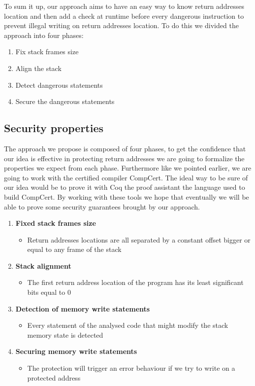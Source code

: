 \documentclass[11pt]{sdm}
\begin{document}
\hfill \break 
	To sum it up, our approach aims to have an easy way to know return addresses location and then add a check at runtime before every dangerous instruction to prevent illegal writing on return addresses location.
To do this we divided the approach into four phases:
\begin{enumerate}
	\item Fix stack frames size
	\item Align the stack
	\item Detect dangerous statements
	\item Secure the dangerous statements
\end{enumerate}


\subsection{Security properties}
\label{sub:Security properties}
	The approach we propose is composed of four phases, to get the confidence that our idea is effective in protecting return addresses we are going to formalize the properties we expect from each phase. 
Furthermore like we pointed earlier, we are going to work with the certified compiler CompCert.
The ideal way to be sure of our idea would be to prove it with Coq the proof assistant the language used to build CompCert.
By working with these tools we hope that eventually we will be able to prove some security guarantees brought by our approach.

\begin{enumerate}
	\item \textbf{Fixed stack frames size}
		\begin{itemize}
			\item Return addresses locations are all separated by a constant offset bigger or equal to any frame of the stack
		\end{itemize}
	\item \textbf{Stack alignment}
		\begin{itemize}
			\item The first return address location of the program has its least significant bits equal to 0
		\end{itemize}
	\item \textbf{Detection of memory write statements}
		\begin{itemize}
			\item Every statement of the analysed code that might modify the stack memory state is detected
		\end{itemize}
	\item \textbf{Securing memory write statements}
		\begin{itemize}
			\item The protection will trigger an error behaviour if we try to write on a protected address
		\end{itemize}
\end{enumerate}
\end{document}

